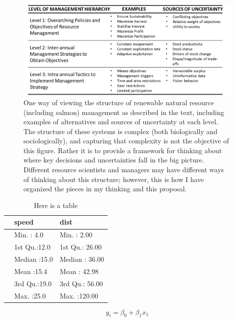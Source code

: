 \documentclass[12pt,]{book}
\theoremstyle{definition}
\theoremstyle{definition}
\theoremstyle{definition}
\theoremstyle{remark}
\begin{document}
\newpage

\begin{figure}
  \includegraphics{img/Ch1/fig1_1.png}
  \caption{One way of viewing the structure of renewable natural resource (including salmon) management as described in the text, including examples of alternatives and sources of uncertainty at each level. The structure of these systems is complex (both biologically and sociologically), and capturing that complexity is not the objective of this figure. Rather it is to provide a framework for thinking about where key decisions and uncertainties fall in the big picture. Different resource scientists and managers may have different ways of thinking about this structure; however, this is how I have organized the pieces in my thinking and this proposal.}
  \label{fig:fig1-1}
\end{figure}

\newpage

\begin{table}

\caption{\label{tab:table1-1}Here is a table}
\centering
\begin{tabular}[t]{l|l|l}
\hline
  &     speed &      dist\\
\hline
 & Min.   : 4.0 & Min.   :  2.00\\
\hline
 & 1st Qu.:12.0 & 1st Qu.: 26.00\\
\hline
 & Median :15.0 & Median : 36.00\\
\hline
 & Mean   :15.4 & Mean   : 42.98\\
\hline
 & 3rd Qu.:19.0 & 3rd Qu.: 56.00\\
\hline
 & Max.   :25.0 & Max.   :120.00\\
\hline
\end{tabular}
\end{table}

\begin{equation}
  y_i = \beta_0 + \beta_1 x_1
  \label{eq:test}
\end{equation}
\end{document}

